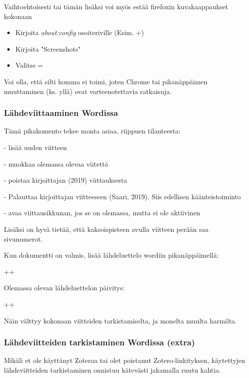 \documentclass[a4paper,12pt]{scrartcl}
\begin{document}
Vaihtoehtoisesti tai tämän lisäksi voi myös estää firefoxin kuvakaappaukset kokonaan

\begin{itemize}
	\item Kirjoita \emph{about:config} osoiteriville (Esim. +)
	\item Kirjoita "Screenshots"
	\item Valitse  = 
\end{itemize}

Voi olla, että silti homma ei toimi, joten Chrome tai pikanäppäimen muuttaminen (ks. yllä) ovat varteenotettavia ratkaisuja.

\subsubsection{Lähdeviittaaminen Wordissa}

Tämä pikakomento tekee monta asiaa, riippuen tilanteesta:

- lisää uuden viitteen

- muokkaa olemassa olevaa viitettä

- poistaa kirjoittajan (2019) viittauksesta

- Palauttaa kirjoittajan viitteeseen (Saari, 2019). Siis edellisen käänteistoiminto

- avaa viittausikkunan, jos se on olemassa, mutta ei ole aktiivinen


Lisäksi on hyvä tietää, että kaksoispisteen \keys{:} avulla viitteen perään saa sivunumerot.

Kun dokumentti on valmis, lisää lähdeluettelo wordiin pikanäppäimellä:

\keys{\ctrl}++

Olemassa olevan lähdeluettelon päivitys:

\keys{\ctrl}++

Näin välttyy kokonaan viitteiden tarkistamiselta, ja monelta muulta harmilta.

\subsubsection{Lähdeviitteiden tarkistaminen Wordissa (extra)}
Mikäli et ole käyttänyt Zoteroa tai olet poistanut Zotero-linkityksen, käytettyjen lähdeviitteiden tarkistaminen onnistuu kätevästi jakamalla ruutu kahtia.

\end{document}
